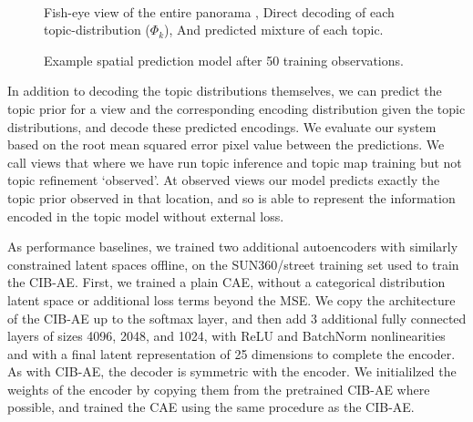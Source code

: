 \begin{figure}
\begin{minipage}{0.44\textwidth}
{        } \\
    \end{minipage}
    
    \caption{Example spatial prediction model after 50 training observations. \protect{}} Fish-eye view of the entire panorama \protect{}, Direct decoding of each topic-distribution ($\Phi_k$), And \protect{} predicted mixture of each topic.
    \label{fig:pano-24}
\end{figure}

In addition to decoding the topic distributions themselves, we can predict the topic prior for a view and the corresponding encoding distribution given the topic distributions, and decode these predicted encodings. We evaluate our system based on the root mean squared error pixel value between the predictions. We call views that where we have run topic inference and topic map training but not topic refinement `observed'. At observed views our model predicts exactly the topic prior observed in that location, and so is able to represent the information encoded in the topic model without external loss.

As performance baselines, we trained two additional autoencoders with similarly constrained latent spaces offline, on the SUN360/street training set used to train the CIB-AE. First, we trained a plain CAE, without a categorical distribution latent space or additional loss terms beyond the MSE. We copy the architecture of the CIB-AE up to the softmax layer, and then add 3 additional fully connected layers of sizes 4096, 2048, and 1024, with ReLU and BatchNorm nonlinearities and with a final latent representation of 25 dimensions to complete the encoder. As with CIB-AE, the decoder is symmetric with the encoder. We initialilzed the weights of the encoder by copying them from the pretrained CIB-AE where possible, and trained the CAE using the same procedure as the CIB-AE.

